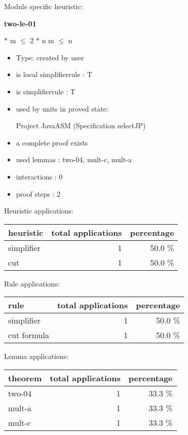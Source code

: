 \documentclass[a4paper]{article}
\begin{document}
Module specific heuristic:

\pagebreak

{\LARGE\bf two-le-01}\label{lemma-two-le-01}

\medskip

  $*$ m $\le$ 2 $*$ n \Equiv m $\le$ n

\begin{itemize}

\item Type: created by user

\item is local simplifierrule : T
\item is simplifierrule : T
\item used by units in proved state:

Project JavaASM (Specification selectJP)
\item       a complete proof exists
\item       used lemmas  : two-04, mult-c, mult-a
\item       interactions : 0
\item       proof steps  : 2
\end{itemize}

\medskip


Heuristic applications:

\begin{supertabular}{l|r|r}
heuristic	& total applications & percentage \\ \hline
simplifier & 1 & 50.0 \% \\
cut & 1 & 50.0 \% \\

\end{supertabular}

Rule applications:

\begin{supertabular}{l|r|r}
rule	        & total applications & percentage \\ \hline
simplifier & 1 & 50.0 \% \\
cut formula & 1 & 50.0 \% \\

\end{supertabular}

Lemma applications:

\begin{supertabular}{l|r|r}
theorem	        & total applications & percentage \\ \hline
two-04 & 1 & 33.3 \% \\
mult-a & 1 & 33.3 \% \\
mult-c & 1 & 33.3 \% \\

\end{supertabular}
\end{document}

